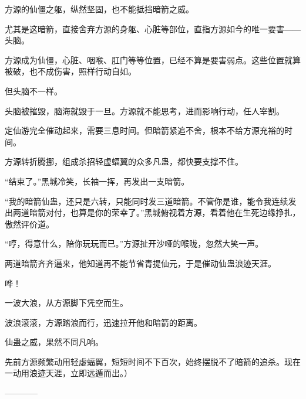\begin{this_body}
方源的仙僵之躯，纵然坚固，也不能抵挡暗箭之威。

尤其是这暗箭，直接舍弃方源的身躯、心脏等部位，直指方源如今的唯一要害――头脑。

方源成为仙僵，心脏、咽喉、肛门等等位置，已经不算是要害弱点。这些位置就算被破，也不成伤害，照样行动自如。

但头脑不一样。

头脑被摧毁，脑海就毁于一旦。方源就不能思考，进而影响行动，任人宰割。

定仙游完全催动起来，需要三息时间。但暗箭紧追不舍，根本不给方源充裕的时间。

方源转折腾挪，组成杀招轻虚蝠翼的众多凡蛊，都快要支撑不住。

“结束了。”黑城冷笑，长袖一挥，再发出一支暗箭。

“我的暗箭仙蛊，还只是六转，只能同时发三道暗箭。不管你是谁，能令我连续发出两道暗箭对付，也算是你的荣幸了。”黑城俯视着方源，看着他在生死边缘挣扎，傲然评价道。

“哼，得意什么，陪你玩玩而已。”方源扯开沙哑的喉咙，忽然大笑一声。

两道暗箭齐齐逼来，他知道再不能节省青提仙元，于是催动仙蛊浪迹天涯。

哗！

一波大浪，从方源脚下凭空而生。

波浪滚滚，方源踏浪而行，迅速拉开他和暗箭的距离。

仙蛊之威，果然不同凡响。

先前方源频繁动用轻虚蝠翼，短短时间不下百次，始终摆脱不了暗箭的追杀。现在一动用浪迹天涯，立即远遁而出。）

------------

\end{this_body}

